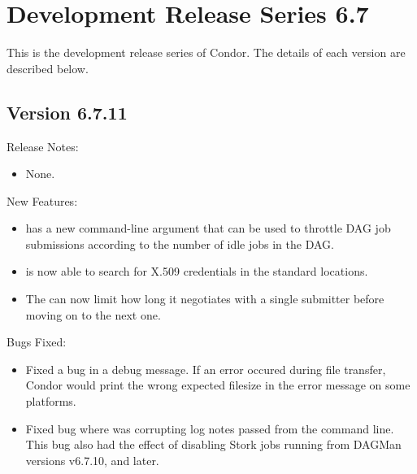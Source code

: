 \section{\label{sec:History-6-7}Development Release Series 6.7}

This is the development release series of Condor.
The details of each version are described below.

\subsection{\label{sec:New-6-7.11}Version 6.7.11}

\noindent Release Notes:

\begin{itemize}

\item None.

\end{itemize}


\noindent New Features:

\begin{itemize}

\item {} has a new  command-line argument
that can be used to throttle DAG job submissions according to the number
of idle jobs in the DAG.

\item {} is now able to search for X.509 credentials in the
standard locations.

\item The  can now limit how long it negotiates with a 
single submitter before moving on to the next one. 

\end{itemize}

\noindent Bugs Fixed:

\begin{itemize}

\item Fixed a bug in a debug message.  If an error occured during file
transfer, Condor would print the wrong expected filesize in the error message
on some platforms.

\item Fixed bug where  was corrupting log notes passed from the
command line.  This bug also had the effect of disabling Stork jobs running
from DAGMan versions v6.7.10, and later.

\end{itemize}

